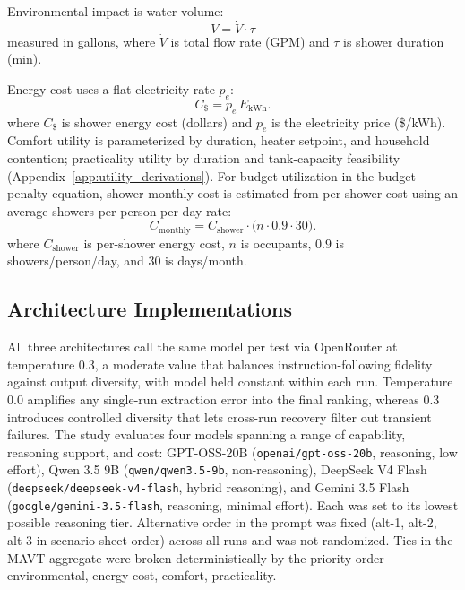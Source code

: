 \documentclass[final,3p,times]{elsarticle}
\begin{document}
Environmental impact is water volume:
\begin{equation}
    V = \dot{V} \cdot \tau
    \label{eq:shower_volume}
\end{equation}
\noindent measured in gallons, where $\dot{V}$ is total flow rate (GPM) and $\tau$ is shower duration (min).

Energy cost uses a flat electricity rate $p_e$:
\begin{equation}
  C_{\$}=p_e\,E_{\mathrm{kWh}}.
  \label{eq:shower_cost}
\end{equation}
\noindent where $C_{\$}$ is shower energy cost (dollars) and $p_e$ is the electricity price (\$/kWh).
Comfort utility is parameterized by duration, heater setpoint, and household contention; practicality utility by duration and tank-capacity feasibility (Appendix~\ref{app:utility_derivations}).
For budget utilization in the budget penalty equation, shower monthly cost is estimated from per-shower cost using an average showers-per-person-per-day rate:
\begin{equation}
  C_{\mathrm{monthly}} = C_{\mathrm{shower}} \cdot \bigl(n \cdot 0.9 \cdot 30\bigr).
  \label{eq:shower_monthly_cost}
\end{equation}
\noindent where $C_{\mathrm{shower}}$ is per-shower energy cost, $n$ is occupants, $0.9$ is showers/person/day, and $30$ is days/month.

\subsection{Architecture Implementations}
\label{sec:architectures}
All three architectures call the same model per test via OpenRouter at temperature 0.3, a moderate value that balances instruction-following fidelity against output diversity, with model held constant within each run.
Temperature 0.0 amplifies any single-run extraction error into the final ranking, whereas 0.3 introduces controlled diversity that lets cross-run recovery filter out transient failures. The study evaluates four models spanning a range of capability, reasoning support, and cost: GPT-OSS-20B (\texttt{openai/gpt-oss-20b}, reasoning, low effort), Qwen 3.5 9B (\texttt{qwen/qwen3.5-9b}, non-reasoning), DeepSeek V4 Flash (\texttt{deepseek/deepseek-v4-flash}, hybrid reasoning), and Gemini 3.5 Flash (\texttt{google/gemini-3.5-flash}, reasoning, minimal effort). Each was set to its lowest possible reasoning tier. Alternative order in the prompt was fixed (alt-1, alt-2, alt-3 in scenario-sheet order) across all runs and was not randomized. Ties in the MAVT aggregate were broken deterministically by the priority order environmental, energy cost, comfort, practicality.
\end{document}
